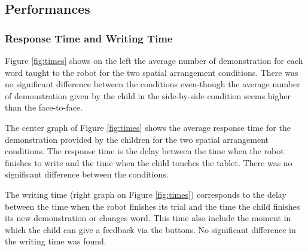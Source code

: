 \documentclass[letterpaper, 10 pt, conference]{ieeeconf}  %
\begin{document}
\subsection{Performances}
\subsubsection{Response Time and Writing Time}
Figure \ref{fig:times} shows on the left the average number of demonstration for each word taught to the robot for the two spatial arrangement conditions. 
There was no significant difference between the conditions even-though the average number of demonstration given by the child in the side-by-side condition seems higher than the face-to-face.

The center graph of Figure \ref{fig:times} shows the average response time for the demonstration provided by the children for the two spatial arrangement conditions.
The response time is the delay between the time when the robot finishes to write and the time when the child touches the tablet.
There was no significant difference between the conditions.
 
The writing time (right graph on Figure \ref{fig:times}) corresponds to the delay between the time when the robot finishes its trial and the time the child finishes its new demonstration or changes word. This time also include the moment in which the child can give a feedback via the buttons.
No significant difference in the writing time was found.
\end{document}
